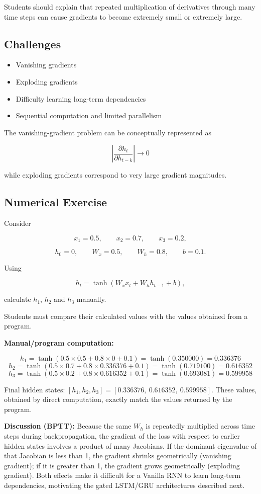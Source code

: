 \documentclass[10pt]{article}
\begin{document}
Students should explain that repeated multiplication of derivatives through
many time steps can cause gradients to become extremely small or extremely
large.

\subsection*{Challenges}

\begin{itemize}
\item Vanishing gradients
\item Exploding gradients
\item Difficulty learning long-term dependencies
\item Sequential computation and limited parallelism
\end{itemize}

The vanishing-gradient problem can be conceptually represented as

\[
\left|\frac{\partial h_t}{\partial h_{t-k}}\right|\rightarrow0
\]

while exploding gradients correspond to very large gradient magnitudes.

\subsection*{Numerical Exercise}

Consider

\[
x_1=0.5,\qquad x_2=0.7,\qquad x_3=0.2,
\]

\[
h_0=0,\qquad W_x=0.5,\qquad W_h=0.8,\qquad b=0.1.
\]

Using

\[
h_t=\tanh(W_xx_t+W_hh_{t-1}+b),
\]

calculate $h_1$, $h_2$ and $h_3$ manually.

Students must compare their calculated values with the values obtained from
a program.

\textbf{Manual/program computation:}

\[
h_1=\tanh(0.5\times0.5+0.8\times0+0.1)=\tanh(0.350000)=0.336376
\]
\[
h_2=\tanh(0.5\times0.7+0.8\times0.336376+0.1)=\tanh(0.719100)=0.616352
\]
\[
h_3=\tanh(0.5\times0.2+0.8\times0.616352+0.1)=\tanh(0.693081)=0.599958
\]

Final hidden states: $[h_1,h_2,h_3]=[0.336376,\ 0.616352,\ 0.599958]$. These
values, obtained by direct computation, exactly match the values returned by
the program.

\textbf{Discussion (BPTT):} Because the same $W_h$ is repeatedly multiplied
across time steps during backpropagation, the gradient of the loss with
respect to earlier hidden states involves a product of many Jacobians. If
the dominant eigenvalue of that Jacobian is less than 1, the gradient
shrinks geometrically (vanishing gradient); if it is greater than 1, the
gradient grows geometrically (exploding gradient). Both effects make it
difficult for a Vanilla RNN to learn long-term dependencies, motivating the
gated LSTM/GRU architectures described next.
\end{document}
